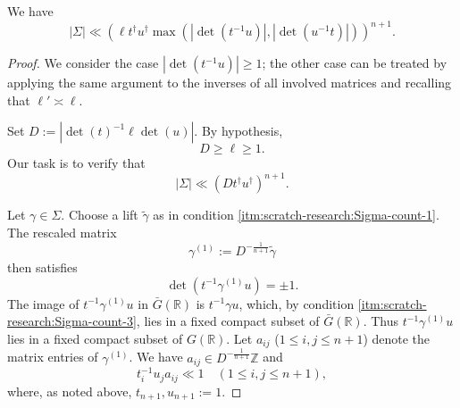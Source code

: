 \begin{lemma}\label{lem:standard2:crude-a-priori-counting}
  We have
  \begin{equation*}
    |\Sigma| \ll
    \left( \ell t^\dagger u^\dagger \max(|\det(t^{-1} u)|, |\det(u^{-1} t)|) \right)^{n+1}.
  \end{equation*}
\end{lemma}
\begin{proof}
  We consider the case $|\det(t^{-1} u)| \geq 1$; the other case can be treated by applying the same argument to the inverses of all involved matrices and recalling that $\ell ' \asymp \ell$.

  Set $D := |\det(t)^{-1} \ell \det(u)|$.  By hypothesis,
  \begin{equation}\label{eq:d-geq-ell}
    D \geq \ell \geq 1.
  \end{equation}
  Our task is to verify that
  \begin{equation*}
    |\Sigma| \ll (D t^\dagger u^\dagger)^{n+1}.
  \end{equation*}

  Let $\gamma \in \Sigma$.  Choose a lift $\tilde{\gamma}$ as in condition \eqref{itm:scratch-research:Sigma-count-1}.  The rescaled matrix
  \begin{equation*}
    \gamma^{(1)} := D^{- \frac{1}{n+1}} \tilde{\gamma }
  \end{equation*}
  then satisfies
  \begin{equation*}
    \det(t^{-1} \gamma^{(1)} u) = \pm 1.
  \end{equation*}
  The image of $t^{-1} \gamma^{(1)} u$ in $\bar{G}(\mathbb{R})$ is $t^{-1} \gamma u$, which, by condition \eqref{itm:scratch-research:Sigma-count-3}, lies in a fixed compact subset of $\bar{G}(\mathbb{R})$.  Thus $t^{-1} \gamma^{(1)} u$ lies in a fixed compact subset of $G(\mathbb{R})$.  Let $a_{i j}$ ($1 \leq i, j \leq n+1$) denote the matrix entries of $\gamma^{(1)}$.  We have $a_{i j} \in D^{- \frac{1}{n+1}} \mathbb{Z}$ and
  \begin{equation}\label{eq:r_i-1-s_j}
    t_i^{-1} u_j a_{i j} \ll 1
    \quad
    (1 \leq i, j \leq n+1),
  \end{equation}
  where, as noted above, $t_{n+1}, u_{n+1} := 1$.


\end{proof}
